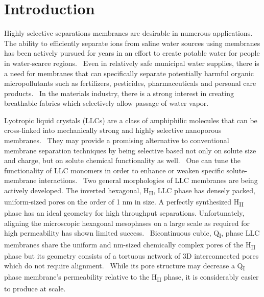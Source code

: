 \documentclass[journal=ancac3,manuscript=article,layout=twocolumn]{achemso}
\begin{document}
  \maketitle
  
  \graphicspath{{./figures/arxiv_figures/}{./supporting_figures/arxiv_figures/}}

  \section{Introduction}

  Highly selective separations membranes are desirable in numerous
  applications. The ability to efficiently separate ions from saline water
  sources using membranes has been actively pursued for years in an effort to
  create potable water for people in water-scarce
  regions.~\cite{werber_materials_2016} Even in relatively safe municipal water
  supplies, there is a need for membranes that can specifically separate
  potentially harmful organic micropollutants such as fertilizers, pesticides,
  pharmaceuticals and personal care products.~\cite{barbosa_occurrence_2016} In
  the materials industry, there is a strong interest in creating breathable
  fabrics which selectively allow passage of water
  vapor.~\cite{mondloch_destruction_2015}

  Lyotropic liquid crystals (LLCs) are a class of amphiphilic molecules that
  can be cross-linked into mechanically strong and highly selective nanoporous
  membranes.~\cite{gin_polymerized_2008} They may provide a promising
  alternative to conventional membrane separation techniques by being selective
  based not only on solute size and charge, but on solute chemical
  functionality as well.~\cite{dischinger_application_2017} One can tune the
  functionality of LLC monomers in order to enhance or weaken specific
  solute-membrane interactions.~\cite{dischinger_effect_2017} Two general
  morphologies of LLC membranes are being actively developed. The inverted
  hexagonal, H\textsubscript{II}, LLC phase has densely packed, uniform-sized
  pores on the order of 1 nm in size. A perfectly synthesized
  H\textsubscript{II} phase has an ideal geometry for high throughput
  separations. Unfortunately, aligning the microscopic hexagonal mesophases on
  a large scale as required for high permeability has shown limited
  success.~\cite{feng_scalable_2014,feng_thin_2016} Bicontinuous cubic,
  Q\textsubscript{I}, phase LLC membranes share the uniform and nm-sized chemically
  complex pores of the H\textsubscript{II} phase but its geometry consists of a
  tortuous network of 3D interconnected pores which do not require
  alignment.~\cite{carter_glycerol-based_2012} While its pore structure may
  decrease a Q\textsubscript{I} phase membrane's permeability relative to the
  H\textsubscript{II} phase, it is considerably easier to produce 
  at scale.~\cite{hatakeyama_nanoporous_2010}
  
\end{document}
